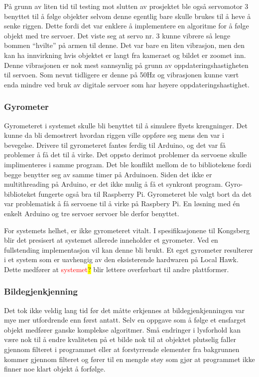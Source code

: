 På grunn av liten tid til testing mot slutten av prosjektet ble også servomotor 3 benyttet til å følge objekter selvom denne egentlig bare skulle brukes til å heve å senke riggen. Dette fordi det var enklere å implementere en algoritme for å følge objekt med tre servoer. Det viste seg at servo nr. 3 kunne vibrere så lenge bommen ``hvilte'' på armen til denne. Det var bare en liten vibrasjon, men den kan ha innvirkning hvis objektet er langt fra kameraet og bildet er zoomet inn. Denne vibrasjonen er nok mest sannsynlig på grunn av oppdateringshastigheten til servoen. Som nevnt tidligere er denne på 50Hz og vibrasjonen kunne vært enda mindre ved bruk av digitale servoer som har høyere oppdateringshastighet.  

\subsubsection{Gyrometer}
Gyrometeret i systemet skulle bli benyttet til å simulere flyets krengninger. Det kunne da bli demostrert hvordan riggen ville oppføre seg mens den var i bevegelse. Drivere til gyrometeret fantes ferdig til Arduino, og det var få problemer å få det til å virke. Det oppsto derimot problemer da servoene skulle implimenteres i samme program. Det ble konflikt mellom de to bibliotekene fordi begge benytter seg av samme timer på Arduinoen. Siden det ikke er multithreading på Arduino, er det ikke mulig å få et synkront program. Gyro-biblioteket fungerte også bra til Raspberry Pi. Gyrometeret ble valgt bort da det var problematisk å få servoene til å virke på Raspbery Pi. En løsning med én enkelt Arduino og tre servoer servoer ble derfor benyttet. 

For systemets helhet, er ikke gyrometeret vitalt. I spesifikasjonene til Kongsberg blir det presisert at systemet allerede inneholder et gyrometer. Ved en fullstending implementasjon vil kan denne bli brukt. Et eget gyrometer resulterer i et system som er uavhengig av den eksisterende hardwaren på Local Hawk. Dette medfører at \textcolor{red}{systemet}\colorbox{yellow}{?} blir lettere overførbart til andre plattformer.

\subsubsection{Bildegjenkjenning}

Det tok ikke veldig lang tid før det måtte erkjennes at bildegjenkjenningen var mye mer utfordrende enn først antatt. Selv en oppgave som å følge et ensfarget objekt medfører ganske komplekse algoritmer. Små endringer i lysforhold kan være nok til å endre kvaliteten på et bilde nok til at objektet plutselig faller gjennom filteret i programmet eller at forstyrrende elementer fra bakgrunnen kommer gjennom filteret og fører til en mengde støy som gjør at programmet ikke finner noe klart objekt å forfølge.

